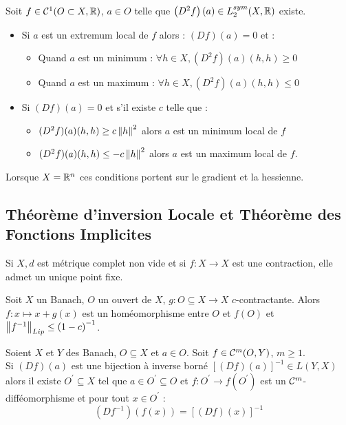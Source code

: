 \documentclass{cours}
\begin{document}
\begin{corollary}
    Soit $f \in \mathcal{C}^{1}(O \subset X, \mathbb{R})$, $a \in O$ telle que $\left(D^{2}f\right)(a) \in L_{2}^{sym}(X, \mathbb{R})$ existe.
    \begin{itemize}
        \item Si $a$ est un extremum local de $f$ alors : $\left(Df\right)(a) = 0$ et :
              \begin{itemize}
                  \item Quand $a$ est un minimum : $\forall h \in X, \left(D^{2}f\right)(a)(h,h) \geq 0$
                  \item Quand $a$ est un maximum : $\forall h \in X, \left(D^{2}f\right)(a)(h,h) \leq 0$
              \end{itemize}
        \item Si $\left(Df\right)(a) = 0$ et s'il existe $c$ telle que :
              \begin{itemize}
                  \item $(D^{2}f)(a)(h, h) \geq c \left\lVert h \right\rVert^{2}$ alors $a$ est un minimum local de $f$
                  \item $(D^{2}f)(a)(h, h) \leq -c \left\lVert h \right\rVert^{2}$ alors $a$ est un maximum local de $f$.
              \end{itemize}
    \end{itemize}
    Lorsque $X = \mathbb{R}^{n}$ ces conditions portent sur le gradient et la hessienne.
\end{corollary}

\subsection{Théorème d'inversion Locale et Théorème des Fonctions Implicites}
\begin{lemma}
    Si $X, d$ est métrique complet non vide et si $f : X \rightarrow X$ est une contraction, elle admet un unique point fixe.
\end{lemma}

\begin{lemma}
    Soit $X$ un Banach, $O$ un ouvert de $X$, $g : O \subseteq X \rightarrow X$ $c$-contractante. Alors $f : x \mapsto x + g(x)$ est un homéomorphisme entre $O$ et $f(O)$ et $\left\lVert f^{-1} \right\rVert_{Lip} \leq \left(1 - c\right)^{-1}$.
\end{lemma}

\begin{theorem}
    Soient $X$ et $Y$ des Banach, $O \subseteq X$ et $a \in O$. Soit $f \in \mathcal{C}^{m}(O, Y)$, $m \geq 1$.\\
    Si $(Df)(a)$ est une bijection à inverse borné $\left[(Df)(a)\right]^{-1} \in L(Y, X)$ alors il existe $O^{'} \subseteq X$ tel que $a \in O^{'} \subseteq O$ et $f : O^{'} \rightarrow f(O^{'})$ est un $\mathcal{C}^{m}$-difféomorphisme et pour tout $x \in O^{'}$ :
    \[
        \left(Df^{-1}\right)(f(x)) = \left[(Df)(x)\right]^{-1}
    \]
\end{theorem}
\end{document}
